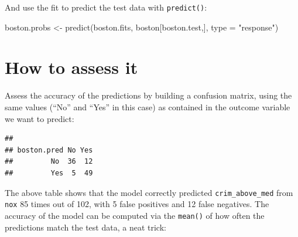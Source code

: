 \documentclass[
]{book}
\newenvironment{Shaded}{\begin{snugshade}}{\end{snugshade}}
\newcommand{\AttributeTok}[1]{\textcolor[rgb]{0.77,0.63,0.00}{#1}}
\newcommand{\FloatTok}[1]{\textcolor[rgb]{0.00,0.00,0.81}{#1}}
\newcommand{\FunctionTok}[1]{\textcolor[rgb]{0.00,0.00,0.00}{#1}}
\newcommand{\NormalTok}[1]{#1}
\newcommand{\OtherTok}[1]{\textcolor[rgb]{0.56,0.35,0.01}{#1}}
\newcommand{\SpecialCharTok}[1]{\textcolor[rgb]{0.00,0.00,0.00}{#1}}
\newcommand{\StringTok}[1]{\textcolor[rgb]{0.31,0.60,0.02}{#1}}
\begin{document}
And use the fit to predict the test data with \texttt{predict()}:

\begin{Shaded}
\begin{Highlighting}[]
\NormalTok{boston.probs }\OtherTok{\textless{}{-}} \FunctionTok{predict}\NormalTok{(boston.fits, boston[boston.test,], }\AttributeTok{type =} \StringTok{"response"}\NormalTok{)}
\end{Highlighting}
\end{Shaded}

\hypertarget{how-to-assess-it-2}{%
\section{How to assess it}\label{how-to-assess-it-2}}

Assess the accuracy of the predictions by building a confusion matrix, using the same values (``No'' and ``Yes'' in this case) as contained in the outcome variable we want to predict:

\begin{Shaded}
\end{Shaded}

\begin{verbatim}
##            
## boston.pred No Yes
##         No  36  12
##         Yes  5  49
\end{verbatim}

The above table shows that the model correctly predicted \texttt{crim\_above\_med} from \texttt{nox} 85 times out of 102, with 5 false positives and 12 false negatives. The accuracy of the model can be computed via the \texttt{mean()} of how often the predictions match the test data, a neat trick:

\begin{Shaded}
\end{Shaded}
\end{document}
